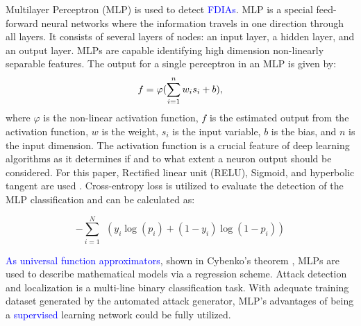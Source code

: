 Multilayer Perceptron (MLP) is used to detect \textcolor{blue}{FDIAs}. MLP is a special feed-forward neural networks where the information travels in one direction through all layers. It consists of several layers of nodes: an input layer, a hidden layer, and an output layer. MLPs are capable identifying high dimension non-linearly separable features. The output for a single perceptron in an MLP is given by: 
\begin{equation}
    f= \varphi (\sum_{i=1}^{n} w_is_i+b)\vspace{-0.07in},
\end{equation}
where $\varphi$ is the non-linear activation function, $f$ is the estimated output from the activation function, $w$ is the weight, $s_i$ is the input variable, $b$ is the bias, and $n$ is the input dimension. 
The activation function is a crucial feature of deep learning algorithms as it determines if and to what extent a neuron output should be considered. For this paper, Rectified linear unit (RELU), Sigmoid, and hyperbolic tangent are used \cite{glorot2010understanding}. Cross-entropy loss is utilized to evaluate the detection of the MLP classification and can be calculated as:  

\begin{equation} \label{equ:MLP_loss}
-\sum_{i=1}^{N}\:\: (y_i \log (p_i)+(1-y_i) \log (1-p_i))
\end{equation}

\fi

\textcolor{blue}{As universal function approximators}, shown in Cybenko's theorem \cite{cybenko1989approximation}, MLPs are used to describe mathematical models via a regression scheme. Attack detection and localization is a multi-line binary classification task. With adequate training dataset generated by the automated attack generator, MLP's advantages of being a \textcolor{blue}{supervised} learning network could be fully utilized.

